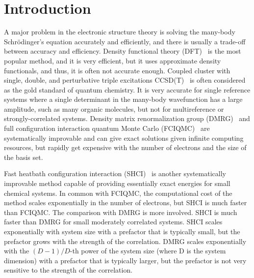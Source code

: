 \documentclass[phd,tocprelim]{cornell}
\begin{document}
\normalspacing \setcounter{page}{1} 
\pagestyle{cornell} \addtolength{\parskip}{0.5\baselineskip}

\chapter{Introduction}
\label{ch:intro}
A major problem in the electronic structure theory is solving the many-body Schr\"{o}dinger's equation accurately and efficiently, and there is usually a trade-off between accuracy and efficiency.
Density functional theory (DFT)~\cite{ParYan-BOOK-89,DreGro-BOOK-90,kohn1999nobel} is the most popular method, and it is very efficient,
but it uses approximate density functionals, and thus, it is often not accurate enough.
Coupled cluster with single, double, and perturbative triple excitations CCSD(T)~\cite{raghavachari1989fifth} is often considered as the gold standard of quantum chemistry.
It is very accurate for single reference systems where a single determinant in the many-body wavefunction has a large amplitude, such as many organic molecules, but not for multireference or strongly-correlated systems.
Density matrix renormalization group (DMRG)~\cite{white1993density,white1999ab,chan2002highly,chan2011density,ShaCha-JCP-12,olivares2015ab,schollwock2005density,GuoLiCha-JCTC-18}
and full configuration interaction quantum Monte Carlo (FCIQMC)~\cite{BooThoAla-JCP-09,CleBooAla-JCP-10,PetHolChaNigUmr-PRL-12,BooGruKreAla-Nat-13,HolChaUmr-JCTC-16}
are
systematically improvable and can give exact solutions given infinite computing resources, but rapidly get expensive with the number of electrons and the size of the basis set.

Fast heatbath configuration interaction (SHCI)~\cite{HolTubUmr-JCTC-16,ShaHolJeaAlaUmr-JCTC-17,HolUmrSha-JCP-17,SmiMusHolSha-JCTC-17,MusSha-JCTC-17,ChiHolOttUmrShaZim-JPCA-18,LiOttHolShaUmr-JCP-18}
is another systematically improvable method capable of providing essentially exact energies for small chemical systems.
In common with FCIQMC, the computational cost of the method scales exponentially in the number of electrons, but SHCI is much faster than FCIQMC.
The comparison with DMRG is more involved.
SHCI is much faster than DMRG for small moderately correlated systems.
SHCI scales exponentially with system size with a prefactor that is typically small, but the prefactor grows with
the strength of the correlation.
DMRG scales exponentially with the $(D-1)/D$-th power of the system size (where D is the system dimension) with a prefactor that is typically larger,
but the prefactor is not very sensitive to the strength of the correlation.
\end{document}
